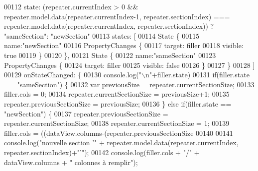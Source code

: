 \begin{DoxyCode}
00112 \textcolor{comment}{                state: (repeater.currentIndex > 0 && repeater.model.data(repeater.currentIndex-1,
       repeater.sectionIndex) === repeater.model.data(repeater.currentIndex, repeater.sectionIndex)) ? "sameSection":
       "newSection"}
00113 \textcolor{comment}{                states: [}
00114 \textcolor{comment}{                    State \{}
00115 \textcolor{comment}{                        name:"newSection"}
00116 \textcolor{comment}{                        PropertyChanges \{}
00117 \textcolor{comment}{                            target: filler}
00118 \textcolor{comment}{                            visible: true}
00119 \textcolor{comment}{                        \}}
00120 \textcolor{comment}{                    \},}
00121 \textcolor{comment}{                    State \{}
00122 \textcolor{comment}{                        name:"sameSection"}
00123 \textcolor{comment}{                        PropertyChanges \{}
00124 \textcolor{comment}{                            target: filler}
00125 \textcolor{comment}{                            visible: false}
00126 \textcolor{comment}{                        \}}
00127 \textcolor{comment}{                    \}}
00128 \textcolor{comment}{                ]}
00129 \textcolor{comment}{                onStateChanged: \{}
00130 \textcolor{comment}{                    console.log("\(\backslash\)n"+filler.state)}
00131 \textcolor{comment}{                    if(filler.state == "sameSection") \{}
00132 \textcolor{comment}{                        var previousSize = repeater.currentSectionSize;}
00133 \textcolor{comment}{                        filler.cols = 0;}
00134 \textcolor{comment}{                        repeater.currentSectionSize = previousSize+1;}
00135 \textcolor{comment}{                        repeater.previousSectionSize = previousSize;}
00136 \textcolor{comment}{                    \} else if(filler.state == "newSection") \{}
00137 \textcolor{comment}{                        repeater.previousSectionSize = repeater.currentSectionSize;}
00138 \textcolor{comment}{                        repeater.currentSectionSize = 1;}
00139 \textcolor{comment}{                        filler.cols = ((dataView.columns-(repeater.previousSectionSize %
00140 \textcolor{comment}{}
00141 \textcolor{comment}{                        console.log("nouvelle section '" + repeater.model.data(repeater.currentIndex,
       repeater.sectionIndex)+"'");}
00142 \textcolor{comment}{                        console.log(filler.cols + "/" + dataView.columns + " colonnes à remplir");}
}
\end{DoxyCode}
